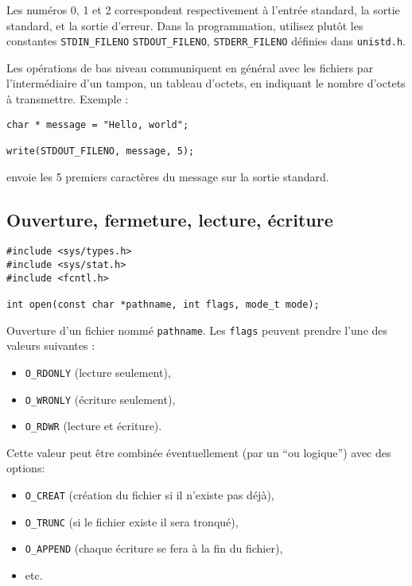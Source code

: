 Les numéros 0, 1 et 2 correspondent respectivement à l'entrée standard,
la sortie standard, et la sortie d'erreur. Dans la programmation,
utilisez plutôt les constantes \texttt{STDIN\_FILENO}
\texttt{STDOUT\_FILENO},
\texttt{STDERR\_FILENO} définies dans \texttt{unistd.h}.


Les opérations de bas niveau communiquent en général avec les fichiers
par l'intermédiaire d'un tampon, un tableau d'octets, en indiquant le
nombre d'octets à transmettre. Exemple :

\source
\begin{lstlisting}
char * message = "Hello, world";

write(STDOUT_FILENO, message, 5);
\end{lstlisting}

envoie les 5 premiers caractères du message sur la sortie standard.



\subsection{Ouverture, fermeture, lecture, écriture}

  
\extrait
\begin{lstlisting}
#include <sys/types.h>
#include <sys/stat.h>
#include <fcntl.h>
  
int open(const char *pathname, int flags, mode_t mode);
\end{lstlisting}


Ouverture d'un fichier nommé \texttt{pathname}. Les \texttt{flags}
peuvent prendre l'une des valeurs suivantes :
\begin{itemize}
  \item \texttt{O\_RDONLY}
    (lecture seulement),
    \item \texttt{O\_WRONLY} (écriture seulement),
    \item \texttt{O\_RDWR} (lecture et écriture).
\end{itemize}
  Cette valeur peut être
  combinée éventuellement (par un ``ou logique'') avec des options:
  \begin{itemize}
\item \texttt{O\_CREAT} (création du fichier si il n'existe pas déjà),
\item \texttt{O\_TRUNC} (si le fichier existe il sera tronqué),
\item \texttt{O\_APPEND} (chaque écriture se fera à la fin du fichier),
  \item etc. 
  \end{itemize}

